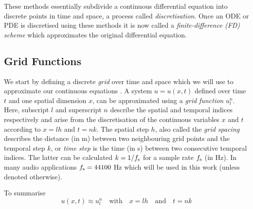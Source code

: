 
These methods essentially subdivide a continuous differential equation into discrete points in time and space, a process called \textit{discretisation}. Once an ODE or PDE is discretised using these methods it is now called a \textit{finite-difference (FD) scheme} which approximates the original differential equation. 

\subsection{Grid Functions }
We start by defining a discrete \textit{grid} over time and space which we will use to approximate our continuous equations . A system $u = u(x,t)$ defined over time $t$ and one spatial dimension $x$, can be approximated using a \textit{grid function} $u_l^n$. Here, subscript $l$ and superscript $n$ describe the spatial and temporal indices respectively and arise from the discretisation of the continuous variables $x$ and $t$ according to $x=lh$ and $t=nk$. The spatial step $h$, also called the \textit{grid spacing} describes the distance (in m) between two neighbouring grid points and the temporal step $k$, or \textit{time step} is the time (in s) between two consecutive temporal indices. The latter can be calculated $k=1/f_\text{s}$ for a sample rate $f_\text{s}$ (in Hz). In many audio applications $f_\text{s} = 44100$ Hz which will be used in this work (unless denoted otherwise).

To summarise
\begin{equation}
    u(x,t) \approx u_l^n \quad \text{with} \quad x=lh \quad \text{and} \quad t = nk
\end{equation}

